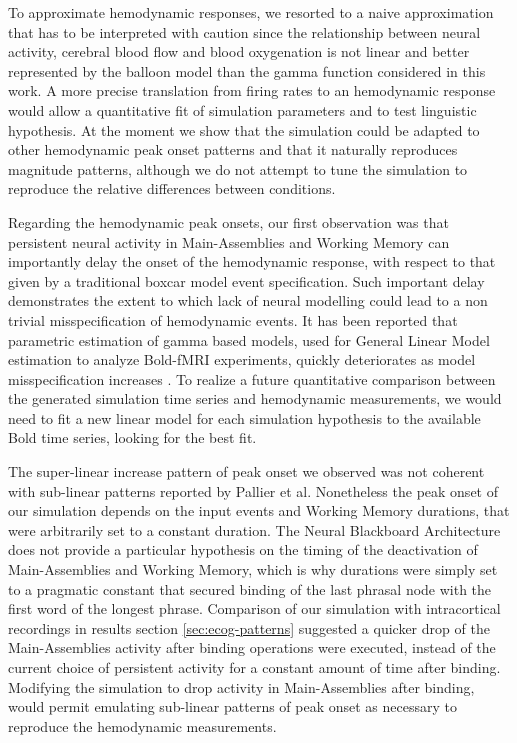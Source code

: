 \documentclass[10pt]{article}
\begin{document}
To approximate hemodynamic responses, we resorted to a naive approximation that has to be interpreted with caution since the relationship between neural activity, cerebral blood flow and blood oxygenation is not linear\cite{Friston_2000,Buxton_2004} and better represented by the balloon model than the gamma function considered in this work\cite{Waldorp_2009}.
A more precise translation from firing rates to an hemodynamic response would allow a quantitative fit of simulation parameters and to test linguistic hypothesis.
At the moment we show that the simulation could be adapted to other hemodynamic peak onset patterns and that it naturally reproduces magnitude patterns, although we do not attempt to tune the simulation to reproduce the relative differences between conditions.

Regarding the hemodynamic peak onsets, our first observation was that persistent neural activity in Main-Assemblies and Working Memory can importantly delay the onset of the hemodynamic response, with respect to that given by a traditional boxcar model event specification.
Such important delay demonstrates the extent to which lack of neural modelling could lead to a non trivial misspecification of hemodynamic events.
It has been reported that parametric estimation of gamma based models, used for General Linear Model estimation to analyze Bold-fMRI experiments, quickly deteriorates as model misspecification increases \cite{lindquist2009modeling}.
To realize a future quantitative comparison between the generated simulation time series and hemodynamic measurements, we would need to fit a new linear model for each simulation hypothesis to the available Bold time series, looking for the best fit.

The super-linear increase pattern of peak onset we observed was not coherent with sub-linear patterns reported by Pallier et al.
Nonetheless the peak onset of our simulation depends on the input events and Working Memory durations, that were arbitrarily set to a constant duration.
The Neural Blackboard Architecture does not provide a particular hypothesis on the timing of the deactivation of Main-Assemblies and Working Memory, which is why durations were simply set to a pragmatic constant that secured binding of the last phrasal node with the first word of the longest phrase.
Comparison of our simulation with intracortical recordings in results section \ref{sec:ecog-patterns} suggested a quicker drop of the Main-Assemblies activity after binding operations were executed, instead of the current choice of persistent activity for a constant amount of time after binding.
Modifying the simulation to drop activity in Main-Assemblies after binding, would permit emulating sub-linear patterns of peak onset as necessary to reproduce the hemodynamic measurements.
\end{document}
